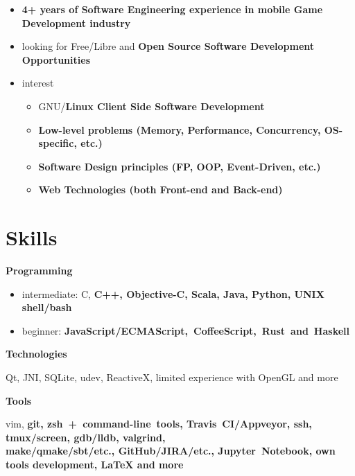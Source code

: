 \begin{itemize}[rightmargin=\dimexpr\linewidth-18cm-\leftmargin\relax]
    \item \bfseries 4+ years \mdseries of Software Engineering experience in mobile Game Development industry
    \item looking for Free/Libre and \bfseries Open Source \mdseries Software Development Opportunities
    \item interest
    \begin{itemize}
        \item GNU/\bfseries Linux \mdseries Client Side \bfseries Software \mdseries Development
        \item \bfseries Low-level \mdseries problems (Memory, Performance, Concurrency, OS-specific, etc.)
        \item \bfseries Software Design \mdseries principles (FP, OOP, Event-Driven, etc.)
        \item \bfseries Web \mdseries Technologies (both Front-end and Back-end)
    \end{itemize}
\end{itemize}

\section*{Skills}

    \bfseries Programming\mdseries
    \begin{itemize}[rightmargin=\dimexpr\linewidth-17.5cm-\leftmargin\relax]
        \item intermediate:
            C,
            \bfseries C++\mdseries,
            Objective-C,
            \bfseries Scala\mdseries,
            Java,
            \bfseries Python\mdseries,
            UNIX shell/\bfseries bash\mdseries
        \item beginner: \bfseries JavaScript/\mdseries ECMAScript,~CoffeeScript,~\bfseries Rust\mdseries~and~Haskell
    \end{itemize}

    \vspace{0.4cm}
    \bfseries Technologies\mdseries

        Qt,
        JNI,
        SQLite,
        udev,
        ReactiveX,
        limited experience with OpenGL and more

    \vspace{0.4cm}
    \bfseries Tools \mdseries
    \begin{adjustwidth}{15pt}{20pt}
        vim,
        \bfseries git\mdseries,
        zsh~+~command-line~tools,
        \bfseries Travis~CI\mdseries/Appveyor,
        ssh,
        tmux/screen,
        \bfseries gdb\mdseries/lldb,
        valgrind,\\
        make/qmake/sbt/etc.,
        \bfseries GitHub\mdseries/JIRA/etc.,
        \bfseries Jupyter~\mdseries Notebook,
        own \bfseries tools development\mdseries,
        {\LaTeX }
        and more
    \end{adjustwidth}

